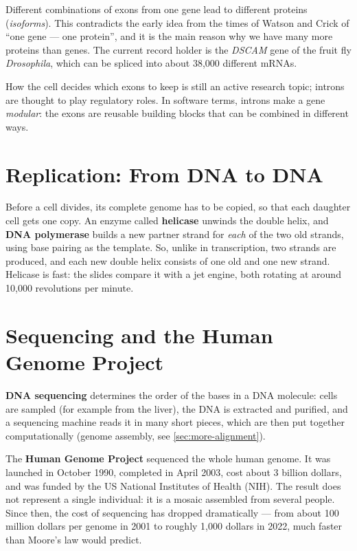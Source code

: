 \documentclass[11pt, oneside]{book}
\let\originalsection\section
\renewcommand{\section}{\Needspace{7\baselineskip}\originalsection}
\begin{document}
\begin{defbox}[title={Alternative splicing}]
Different combinations of exons from one gene lead to different proteins
(\emph{isoforms}). This contradicts the early idea from the times of Watson
and Crick of ``one gene --- one protein'', and it is the main reason why we
have many more proteins than genes. The current record holder is the
\emph{DSCAM} gene of the fruit fly \emph{Drosophila}, which can be spliced
into about 38,000 different mRNAs.
\end{defbox}

How the cell decides which exons to keep is still an active research topic;
introns are thought to play regulatory roles. In software terms, introns make
a gene \emph{modular}: the exons are reusable building blocks that can be
combined in different ways.

\section{Replication: From DNA to DNA}

Before a cell divides, its complete genome has to be copied, so that each
daughter cell gets one copy. An enzyme called \textbf{helicase} unwinds the
double helix, and \textbf{DNA polymerase} builds a new partner strand for
\emph{each} of the two old strands, using base pairing as the template. So,
unlike in transcription, two strands are produced, and each new double helix
consists of one old and one new strand. Helicase is fast: the slides compare
it with a jet engine, both rotating at around 10,000 revolutions per minute.

\section{Sequencing and the Human Genome Project}

\textbf{DNA sequencing} determines the order of the bases in a DNA molecule:
cells are sampled (for example from the liver), the DNA is extracted and
purified, and a sequencing machine reads it in many short pieces, which are
then put together computationally (genome assembly, see
\cref{sec:more-alignment}).

The \textbf{Human Genome Project} sequenced the whole human genome. It was
launched in October 1990, completed in April 2003, cost about 3 billion
dollars, and was funded by the US National Institutes of Health (NIH). The
result does not represent a single individual: it is a mosaic assembled from
several people. Since then, the cost of sequencing has dropped dramatically
--- from about 100 million dollars per genome in 2001 to roughly 1,000
dollars in 2022, much faster than Moore's law would predict.
\end{document}

